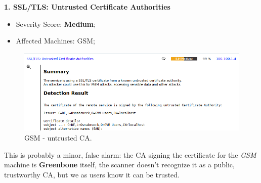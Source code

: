 \textbf{1. SSL/TLS: Untrusted Certificate Authorities}
\begin{itemize}
\item Severity Score: \textbf{Medium};
\item Affected Machines: GSM;
\end{itemize}
\begin{figure}[!htb]
\centering
\begin{minipage}{.5\textwidth}
  \centering
  \includegraphics[width=1\textwidth]{certificateUntrustedAuthorityTLSGSM.png}
  \caption[a]{GSM - untrusted CA.}\label{fig:14}
\end{minipage}%
\end{figure}
This is probably a minor, false alarm: the CA signing the certificate for the \textit{GSM} machine is \textbf{Greenbone} itself, the scanner doesn't recognize it as a public, trustworthy CA, but we as users know it can be trusted.\\

